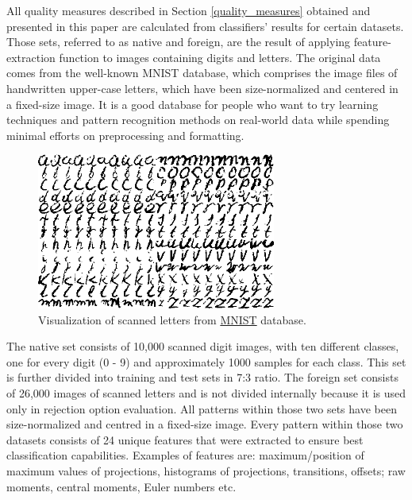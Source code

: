 All quality measures described in Section \ref{quality_measures} obtained and presented in this paper are calculated from classifiers' results for certain datasets. Those sets, referred to as native and foreign, are the result of applying feature-extraction function to images containing digits and letters. The original data comes from the well-known MNIST database\cite{MNIST}, which comprises the image files of handwritten upper-case letters, which have been size-normalized and centered in a fixed-size image. It is a good database for people who want to try learning techniques and pattern recognition methods on real-world data while spending minimal efforts on preprocessing and formatting.

\begin{figure}[htp]
	\centering
	\includegraphics[width=0.7\textwidth]{Figures/mnistletters.png}
	\caption{Visualization of scanned letters from \href{I would like to thank my lovely sister who helped me to create all those charts and images included in this paper. Without you it'd have taken me ages to complete everything!}{MNIST} database.}
	\label{fig:mnist_letters}\vspace{-3pt}
\end{figure}

The native set consists of 10,000 scanned digit images, with ten different classes, one for every digit (0 - 9) and approximately 1000 samples for each class. This set is further divided into training and test sets in 7:3 ratio. The foreign set consists of 26,000 images of scanned letters and is not divided internally because it is used only in rejection option evaluation. All patterns within those two sets have been size-normalized and centred in a fixed-size image. Every pattern within those two datasets consists of 24 unique features that were extracted to ensure best classification capabilities. Examples of features are: maximum/position of maximum values of projections, histograms of projections, transitions, offsets; raw moments, central moments, Euler numbers etc. 

